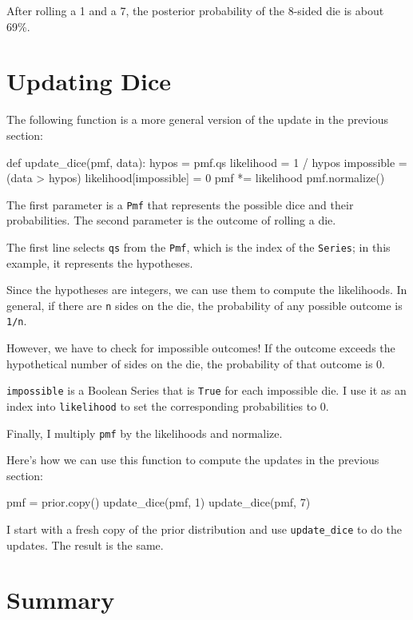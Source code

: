 \documentclass[12pt]{book}
\theoremstyle{exercise}
\newcommand{\py}[1]{{\tt #1}}%
\begin{document}


After rolling a 1 and a 7, the posterior probability of the 8-sided die is about 69\%.


\section{Updating Dice}
\label{dice2}

The following function is a more general version of the update in the previous section:

\begin{code}
def update_dice(pmf, data):
    hypos = pmf.qs
    likelihood = 1 / hypos
    impossible = (data > hypos)
    likelihood[impossible] = 0
    pmf *= likelihood
    pmf.normalize()
\end{code}

The first parameter is a \py{Pmf} that represents the possible dice and their probabilities.
The second parameter is the outcome of rolling a die.

The first line selects \py{qs} from the \py{Pmf}, which is the index of the \py{Series}; in this example, it represents the hypotheses.

Since the hypotheses are integers, we can use them to compute the likelihoods.
In general, if there are \py{n} sides on the die, the probability of any possible outcome is \py{1/n}.

However, we have to check for impossible outcomes!
If the outcome exceeds the hypothetical number of sides on the die, the probability of that outcome is $0$.

\py{impossible} is a Boolean Series that is \py{True} for each impossible die.
I use it as an index into \py{likelihood} to set the corresponding probabilities to $0$.

Finally, I multiply \py{pmf} by the likelihoods and normalize.

Here's how we can use this function to compute the updates in the previous section:

\begin{code}
pmf = prior.copy()
update_dice(pmf, 1)
update_dice(pmf, 7)
\end{code}

I start with a fresh copy of the prior distribution and use \py{update_dice} to do the updates.
The result is the same.


\section{Summary}
\end{document}
